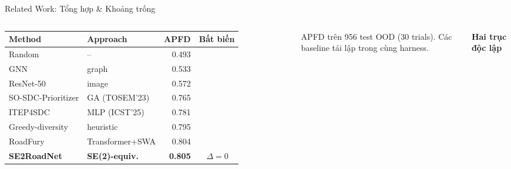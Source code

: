 \documentclass[aspectratio=169,10pt]{beamer}
\newcommand{\cmark}{\ding{51}}
\newcommand{\xmark}{\ding{55}}
\renewcommand{\arraystretch}{1.15}
\begin{document}
\begin{frame}{Related Work: Tổng hợp \& Khoảng trống}
\begin{columns}[c,onlytextwidth]
\scriptsize
\setlength{\tabcolsep}{4pt}
\renewcommand{\arraystretch}{1.18}
\begin{tabular}{@{}l l r c@{}}
  \toprule
  \textbf{Method} & \textbf{Approach} & \textbf{APFD} & \textbf{Bất biến} \\
  \midrule
  \rowcolor{navydeep!6}
  Random            & --                 & 0.493 & \alert{\xmark} \\
  \rowcolor{navydeep!6}
  GNN               & graph              & 0.533 & \alert{\xmark} \\
  \rowcolor{navydeep!6}
  ResNet-50         & image              & 0.572 & \alert{\xmark} \\
  \midrule
  \rowcolor{mLightBrown!8}
  SO-SDC-Prioritizer& GA (TOSEM'23)      & 0.765 & \alert{\xmark} \\
  \rowcolor{mLightBrown!8}
  ITEP4SDC          & MLP (ICST'25)      & 0.781 & \alert{\xmark} \\
  \rowcolor{mLightBrown!8}
  Greedy-diversity  & heuristic          & 0.795 & \alert{\xmark} \\
  \midrule
  \rowcolor{success!8}
  RoadFury          & Transformer+SWA    & 0.804 & \alert{\xmark} \\
  \rowcolor{accent!22}
  \textbf{SE2RoadNet}& \textbf{SE(2)-equiv.} & \textbf{0.805} & \textcolor{success}{\cmark\,$\Delta{=}0$} \\
  \bottomrule
\end{tabular}

\vspace{0.5em}
\tiny\color{gray} APFD trên 956 test OOD (30 trials). Các baseline tái lập trong cùng harness.

\centering
\scriptsize\textbf{Hai trục độc lập}
\vspace{0.2em}


\end{columns}
\end{frame}
\end{document}
